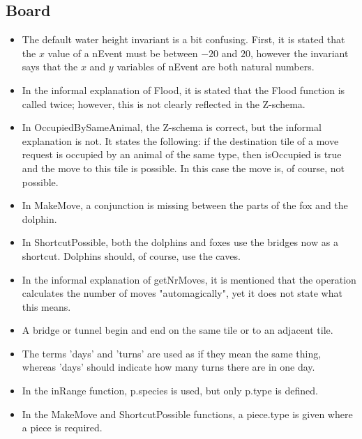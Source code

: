 \documentclass[a4paper,11pt]{article}
\begin{document}
    \subsection{Board}
    \begin{itemize}
        \item The default water height invariant is a bit confusing. First, it is stated that the $x$ value of a nEvent must be between $-20$ and $20$, however the invariant says that the $x$ and $y$ variables of nEvent are both natural numbers.
        \item In the informal explanation of Flood, it is stated that the Flood function is called twice; however, this is not clearly reflected in the Z-schema.
        \item In OccupiedBySameAnimal, the Z-schema is correct, but the informal explanation is not. It states the following: if the destination tile of a move request is occupied by an animal of the same type, then isOccupied is true and the move to this tile is possible. In this case the move is, of course, not possible.
        \item In MakeMove, a conjunction is missing between the parts of the fox and the dolphin.
        \item In ShortcutPossible, both the dolphins and foxes use the bridges now as a shortcut. Dolphins should, of course, use the caves.
        \item In the informal explanation of getNrMoves, it is mentioned that the operation calculates the number of moves "automagically", yet it does not state what this means.
        \item A bridge or tunnel begin and end on the same tile or to an adjacent tile.
        \item The terms 'days' and 'turns' are used as if they mean the same thing, whereas 'days' should indicate how many turns there are in one day.
        \item In the inRange function, p.species is used, but only p.type is defined.
        \item In the MakeMove and ShortcutPossible functions, a piece.type is given where a piece is required.
    \end{itemize}
\end{document}
